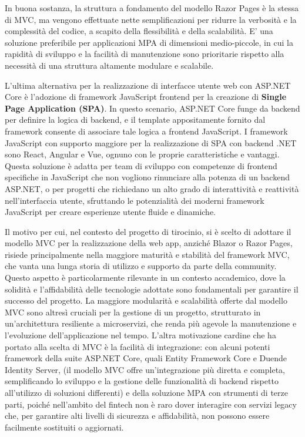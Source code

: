 In buona sostanza, la struttura a fondamento del modello Razor Pages è la stessa di MVC, ma vengono effettuate nette semplificazioni per ridurre la verbosità e la complessità del codice, a scapito della flessibilità e della scalabilità. E' una soluzione preferibile per applicazioni MPA di dimensioni medio-piccole, in cui la rapidità di sviluppo e la facilità di manutenzione sono prioritarie rispetto alla necessità di una struttura altamente modulare e scalabile.

L'ultima alternativa per la realizzazione di interfacce utente web con ASP.NET Core è l'adozione di framework JavaScript frontend per la creazione di \textbf{Single Page Application (SPA)}.
In questo scenario, ASP.NET Core funge da backend per definire la logica di backend, e il template appositamente fornito dal framework consente di associare tale logica a frontend JavaScript. I framework JavaScript con supporto maggiore per la realizzazione di SPA con backend .NET sono React, Angular e Vue, ognuno con le proprie caratteristiche e vantaggi.
Questa soluzione è adatta per team di sviluppo con competenze di frontend specifiche in JavaScript che non vogliono rinunciare alla potenza di un backend ASP.NET, o per progetti che richiedano un alto grado di interattività e reattività nell'interfaccia utente, sfruttando le potenzialità dei moderni framework JavaScript per creare esperienze utente fluide e dinamiche.

Il motivo per cui, nel contesto del progetto di tirocinio, si è scelto di adottare il modello MVC per la realizzazione della web app, anziché Blazor o Razor Pages, risiede principalmente nella maggiore maturità e stabilità del framework MVC, che vanta una lunga storia di utilizzo e supporto da parte della community. Questo aspetto è particolarmente rilevante in un contesto accademico, dove la solidità e l'affidabilità delle tecnologie adottate sono fondamentali per garantire il successo del progetto.
La maggiore modularità e scalabilità offerte dal modello MVC sono altresì cruciali per la gestione di un progetto, strutturato in un'architettura resiliente a microservizi, che renda più agevole la manutenzione e l'evoluzione dell'applicazione nel tempo.
L'altra motivazione cardine che ha portato alla scelta di MVC è la facilità di integrazione: con alcuni potenti framework della suite ASP.NET Core, quali Entity Framework Core e Duende Identity Server, (il modello MVC offre un'integrazione più diretta e completa, semplificando lo sviluppo e la gestione delle funzionalità di backend rispetto all'utilizzo di soluzioni differenti) e della soluzione MPA con strumenti di terze parti, poiché nell'ambito del fintech non è raro dover interagire con servizi legacy che, per garantire alti livelli di sicurezza e affidabilità, non possono essere facilmente sostituiti o aggiornati.

